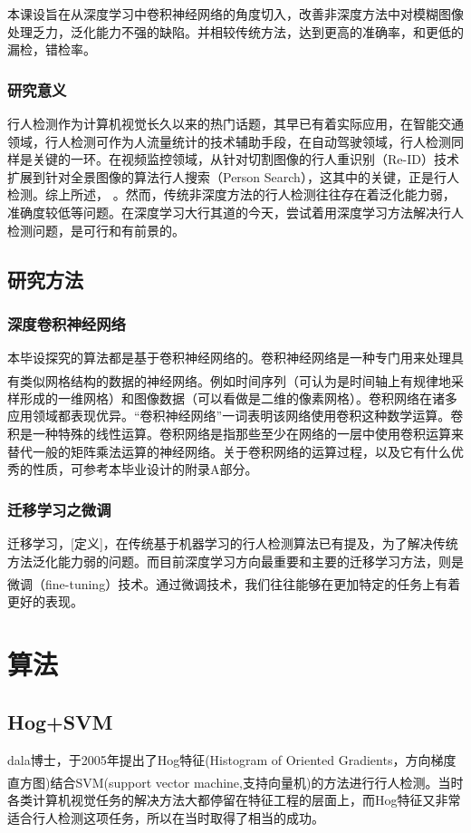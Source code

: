 \documentclass[12pt,a4paper,titlepage]{article}
\newcommand{\upcite}[1]{\textsuperscript{\textsuperscript{\cite{#1}}}}  %
\begin{document}
本课设旨在从深度学习中卷积神经网络的角度切入，改善非深度方法中对模糊图像处理乏力，泛化能力不强的缺陷。并相较传统方法，达到更高的准确率，和更低的漏检，错检率。 
\subsubsection{研究意义}
行人检测作为计算机视觉长久以来的热门话题，其早已有着实际应用，在智能交通领域，行人检测可作为人流量统计的技术辅助手段，在自动驾驶领域，行人检测同样是关键的一环。在视频监控领域，从针对切割图像的行人重识别（Re-ID）技术扩展到针对全景图像的算法行人搜索（Person Search），这其中的关键，正是行人检测。综上所述， 。然而，传统非深度方法的行人检测往往存在着泛化能力弱，准确度较低等问题。在深度学习大行其道的今天，尝试着用深度学习方法解决行人检测问题，是可行和有前景的。

\subsection{研究方法}
\subsubsection{深度卷积神经网络}
本毕设探究的算法都是基于卷积神经网络的。卷积神经网络是一种专门用来处理具有类似网格结构的数据的神经网络\upcite{Goodfellow-et-al-2016-201}。例如时间序列（可认为是时间轴上有规律地采样形成的一维网格）和图像数据（可以看做是二维的像素网格）。卷积网络在诸多应用领域都表现优异。“卷积神经网络”一词表明该网络使用卷积这种数学运算。卷积是一种特殊的线性运算。卷积网络是指那些至少在网络的一层中使用卷积运算来替代一般的矩阵乘法运算的神经网络。关于卷积网络的运算过程，以及它有什么优秀的性质，可参考本毕业设计的附录A部分。

\subsubsection{迁移学习之微调}
迁移学习，[定义]，在传统基于机器学习的行人检测算法已有提及，为了解决传统方法泛化能力弱的问题。而目前深度学习方向最重要和主要的迁移学习方法，则是微调（fine-tuning）技术\upcite{yosinski2014transferable}。通过微调技术，我们往往能够在更加特定的任务上有着更好的表现。


\section{算法}
\subsection{Hog+SVM}
dala博士，于2005年提出了Hog特征(Histogram of Oriented Gradients，方向梯度直方图)结合SVM(support vector machine,支持向量机)的方法进行行人检测\upcite{dalal2005histograms}。当时各类计算机视觉任务的解决方法大都停留在特征工程的层面上，而Hog特征又非常适合行人检测这项任务，所以在当时取得了相当的成功。
\end{document}
